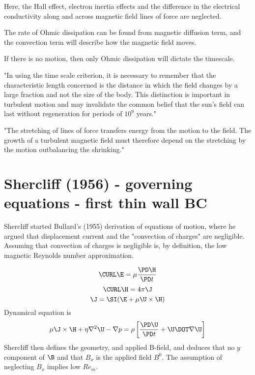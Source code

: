 \documentclass[11pt]{article}
\begin{document}
Here, the Hall effect, electron inertia effects and the difference in the electrical conductivity along and across magnetic field lines of force are neglected.

The rate of Ohmic dissipation can be found from magnetic diffusion term, and the convection term will describe how the magnetic field moves.

If there is no motion, then only Ohmic dissipation will dictate the timescale.

"In using the time scale criterion, it is necessary to remember that the characteristic length concerned is the distance in which the field changes by a large fraction and not the size of the body. This distinction is important in turbulent motion and may invalidate the common belief that the sun's field can last without regeneration for periods of $10^9$ years."

"The stretching of lines of force transfers energy from the motion to the field. The growth of a turbulent magnetic field must therefore depend on the stretching by the motion outbalancing the shrinking."

\newpage

\section{Shercliff (1956) - governing equations - first thin wall BC}

Shercliff started Bullard's (1955) derivation of equations of motion, where he argued that displacement current and the "convection of charges" are negligible. Assuming that convection of charges is negligible is, by definition, the low magnetic Reynolds number approximation.

\begin{equation}
  \CURL \E = \mu \frac{\PD \H}{\PD t}
\end{equation}
\begin{equation}
	\CURL \H = 4 \pi \J
\end{equation}
\begin{equation}
	\J = \SI (\E + \mu \U \times \H)
\end{equation}
Dynamical equation is
\begin{equation}
	\mu \J \times \H + \eta \nabla^2 \U - \nabla p = \rho \left[ \frac{\PD \U}{\PD t} + \U \DOT \nabla \U \right]
\end{equation}
Shercliff then defines the geometry, and applied B-field, and deduces that no $y$ component of $\B$ and that $B_x$ is the applied field $B^0$. The assumption of neglecting $B_x$ implies low $Re_m$.
\end{document}
